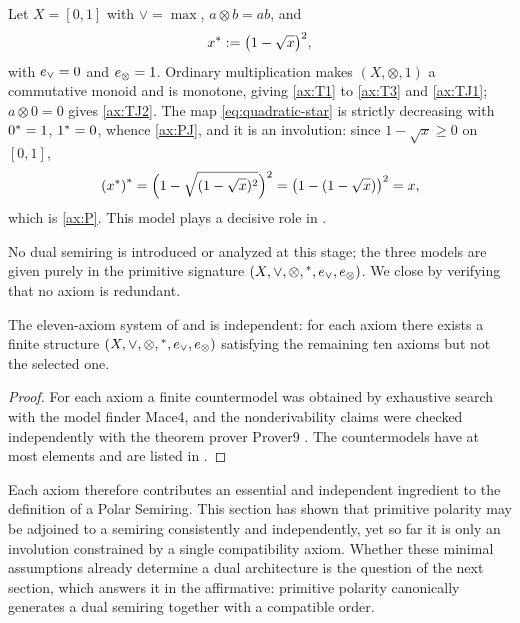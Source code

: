 \begin{example}\label{ex:quadratic}
Let $X = [0,1]$ with $\vee = \max$, $a \otimes b = ab$, and
\begin{equation}\label{eq:quadratic-star}
  {x}^{*} := \bigl(1 - \sqrt{x}\bigr)^{2},
\end{equation}
with $e_{\vee} = 0$ and $e_{\otimes} = 1$. Ordinary multiplication makes
$(X,\otimes,1)$ a commutative monoid and is monotone, giving \eqref{ax:T1}
to \eqref{ax:T3} and \eqref{ax:TJ1}; $a \otimes 0 = 0$ gives \eqref{ax:TJ2}.
The map \eqref{eq:quadratic-star} is strictly decreasing with ${0}^{*}=1$,
${1}^{*}=0$, whence \eqref{ax:PJ}, and it is an involution: since
$1 - \sqrt{x} \geq 0$ on $[0,1]$,
$$
  {({x}^{*})}^{*}
  = \Bigl(1 - \sqrt{(1-\sqrt{x})^{2}}\Bigr)^{2}
  = \bigl(1 - (1 - \sqrt{x})\bigr)^{2}
  = x,
$$
which is \eqref{ax:P}. This model plays a decisive role in
.
\end{example}

No dual semiring is introduced or analyzed at this stage; the three models
are given purely in the primitive signature $(X,\vee,\otimes,{}^{*},e_{\vee},e_{\otimes})$.
We close by verifying that no axiom is redundant.

\begin{theorem}[Independence]\label{thm:independence}
The eleven-axiom system of  and  is
independent: for each axiom there exists a finite structure
$(X,\vee,\otimes,{}^{*},e_{\vee},e_{\otimes})$ satisfying the remaining ten axioms but not
the selected one.
\end{theorem}

\begin{proof}
For each axiom a finite countermodel was obtained by exhaustive search with
the model finder Mace4, and the nonderivability claims were checked
independently with the theorem prover Prover9 \citep{McCune2005}. The
countermodels have at most  elements
and are listed in .
\end{proof}

Each axiom therefore contributes an essential and independent ingredient to
the definition of a Polar Semiring. This section has shown that primitive
polarity may be adjoined to a semiring consistently and independently, yet
so far it is only an involution constrained by a single compatibility
axiom. Whether these minimal assumptions already determine a dual
architecture is the question of the next section, which answers it in the
affirmative: primitive polarity canonically generates a dual semiring
together with a compatible order.
